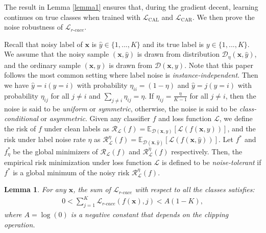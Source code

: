 \documentclass{article}
\newtheorem{lemma}{Lemma}
\begin{document}
The result in Lemma \ref{lemma1} ensures that, during the gradient decent, learning continues on true classes when trained with $\mathcal{L}_\textrm{CAL}$ and $\mathcal{L}_\textrm{CAR}$. We then prove the noise robustness of $\mathcal{L}_{r\text{-}cace}$.

Recall that noisy label of $\bm{x}$ is $\hat{y} \in \{1,...,K\}$ and its true label is $y \in\{1,...,K\}$. We assume that the noisy sample $(\bm{x},\hat{y})$ is drawn from distribution $\mathcal{D}_{\eta}(\bm{x},\hat{y})$, and the ordinary sample $(\bm{x},y)$ is drawn from $\mathcal{D}(\bm{x},y)$. Note that this paper follows the most common setting where label noise is \emph{instance-independent}. Then we have $\hat{y} = i ( y = i)$ with probability $\eta_{ii}=(1-\eta)$ and $\hat{y}=j (y=i)$ with probability $\eta_{ij}$ for all $j\ne i$ and $\sum_{j\ne i}\eta_{ij}=\eta$. If $\eta_{ij}=\frac{\eta}{K-1}$ for all $j\ne i$, then the noise is said to be \emph{uniform} or \emph{symmetric}, otherwise, the noise is said to be \emph{class-conditional} or \emph{asymmetric}. Given any classifier $f$ and loss function $\mathcal{L}$, we define the risk of $f$ under clean labels as $\mathcal{R}_{\mathcal{L}}(f)=\mathbb{E}_{\mathcal{D}(\bm{x},y)}[\mathcal{L}(f(\bm{x},y))]$, and the risk under label noise rate $\eta$ as $\mathcal{R}^{\eta}_{\mathcal{L}}(f)=\mathbb{E}_{\mathcal{D}(\bm{x},\hat{y})}[\mathcal{L}(f(\bm{x},\hat{y}))]$. Let $f^{*}$ and $f^{*}_{\eta}$ be the global minimizers of $\mathcal{R}_{\mathcal{L}}(f)$ and $\mathcal{R}^{\eta}_{\mathcal{L}}(f)$ respectively. Then, the empirical risk minimization under loss function $\mathcal{L}$ is defined to be \emph{noise-tolerant} if $f^{*}$ is a global minimum of the noisy risk $\mathcal{R}^{\eta}_{\mathcal{L}}(f)$.
\begin{lemma}
	\label{lamma2}
	For any $\bm{x}$, the sum of $\mathcal{L}_{r\text{-}cace}$ with respect to all the classes satisfies:
	\begin{align}
		0 < \sum_{j=1}^{K}\mathcal{L}_{r\text{-}cace}(f(\bm{x}),j) < A(1-K),
	\end{align}
	where $A=\log(0)$ is a negative constant that depends on the clipping operation.
\end{lemma}
\end{document}
